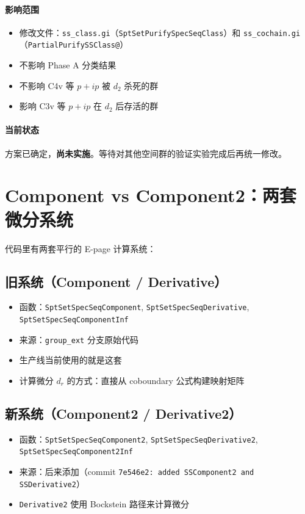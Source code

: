 \documentclass[a4paper,fontset=ubuntu,12pt]{ctexart}
\begin{document}
\paragraph{影响范围}
\begin{itemize}
\item 修改文件：\texttt{ss\_class.gi}（\texttt{SptSetPurifySpecSeqClass}）和
      \texttt{ss\_cochain.gi}（\texttt{PartialPurifySSClass@}）
\item 不影响 Phase A 分类结果
\item 不影响 C4v 等 $p{+}ip$ 被 $d_2$ 杀死的群
\item 影响 C3v 等 $p{+}ip$ 在 $d_2$ 后存活的群
\end{itemize}

\paragraph{当前状态}
方案已确定，\textbf{尚未实施}。等待对其他空间群的验证实验完成后再统一修改。

\section{Component vs Component2：两套微分系统}
\label{sec:component-vs-component2}

代码里有两套平行的 E-page 计算系统：

\subsection{旧系统（Component / Derivative）}
\begin{itemize}
\item 函数：\texttt{SptSetSpecSeqComponent}, \texttt{SptSetSpecSeqDerivative},
      \texttt{SptSetSpecSeqComponentInf}
\item 来源：\texttt{group\_ext} 分支原始代码
\item 生产线当前使用的就是这套
\item 计算微分 $d_r$ 的方式：直接从 coboundary 公式构建映射矩阵
\end{itemize}

\subsection{新系统（Component2 / Derivative2）}
\begin{itemize}
\item 函数：\texttt{SptSetSpecSeqComponent2}, \texttt{SptSetSpecSeqDerivative2},
      \texttt{SptSetSpecSeqComponent2Inf}
\item 来源：后来添加（commit \texttt{7e546e2: added SSComponent2 and SSDerivative2}）
\item \texttt{Derivative2} 使用 Bockstein 路径来计算微分
\end{itemize}
\end{document}
